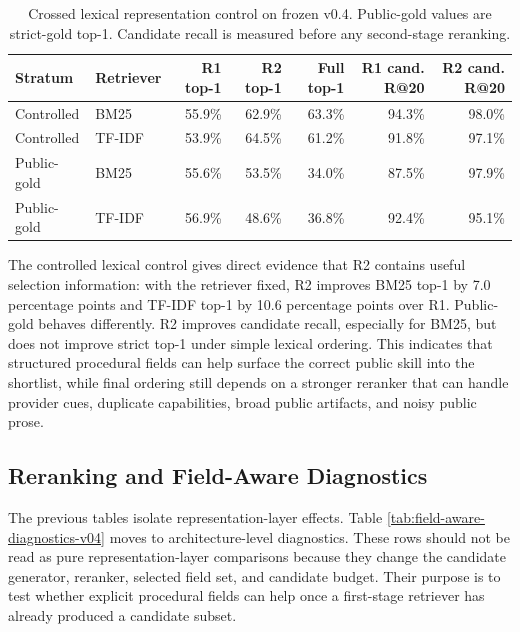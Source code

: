 \begin{table}[h]
\centering
\scriptsize
\begin{tabular}{p{}p{}rrrrr}
\toprule
Stratum & Retriever & R1 top-1 & R2 top-1 & Full top-1 & R1 cand. R@20 & R2 cand. R@20 \\
\midrule
Controlled & BM25 & 55.9\% & 62.9\% & 63.3\% & 94.3\% & 98.0\% \\
Controlled & TF-IDF & 53.9\% & 64.5\% & 61.2\% & 91.8\% & 97.1\% \\
Public-gold & BM25 & 55.6\% & 53.5\% & 34.0\% & 87.5\% & 97.9\% \\
Public-gold & TF-IDF & 56.9\% & 48.6\% & 36.8\% & 92.4\% & 95.1\% \\
\bottomrule
\end{tabular}
\caption{Crossed lexical representation control on frozen v0.4. Public-gold values are strict-gold top-1. Candidate recall is measured before any second-stage reranking.}
\label{tab:crossed-lexical-representation-v04}
\end{table}

The controlled lexical control gives direct evidence that R2 contains useful selection information: with the retriever fixed, R2 improves BM25 top-1 by 7.0 percentage points and TF-IDF top-1 by 10.6 percentage points over R1. Public-gold behaves differently. R2 improves candidate recall, especially for BM25, but does not improve strict top-1 under simple lexical ordering. This indicates that structured procedural fields can help surface the correct public skill into the shortlist, while final ordering still depends on a stronger reranker that can handle provider cues, duplicate capabilities, broad public artifacts, and noisy public prose.

\subsection{Reranking and Field-Aware Diagnostics}

The previous tables isolate representation-layer effects. Table \ref{tab:field-aware-diagnostics-v04} moves to architecture-level diagnostics. These rows should not be read as pure representation-layer comparisons because they change the candidate generator, reranker, selected field set, and candidate budget. Their purpose is to test whether explicit procedural fields can help once a first-stage retriever has already produced a candidate subset.

